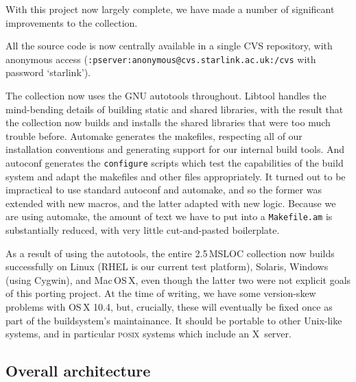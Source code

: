 \documentclass{speauth}
\begin{document}
With this project now largely complete, we have made a number of
significant improvements to the collection.

All the source code is now centrally available in a single CVS
repository, with anonymous access
(\texttt{:pserver:anonymous@cvs.starlink.ac.uk:/cvs} with password `starlink').

The collection now uses the GNU autotools throughout.  Libtool handles the
mind-bending details of building static and shared libraries, with the
result that the collection now builds and installs the shared
libraries that were too much trouble before.  Automake generates the
makefiles, respecting all of our installation conventions and
generating support for our internal build tools.  And autoconf
generates the \texttt{configure} scripts which test the capabilities
of the build system and adapt the makefiles and other files
appropriately.  It turned out to be impractical to use standard
autoconf and automake, and so the former was extended with new macros,
and the latter adapted with new logic.  Because we are using automake,
the amount of text we have to put into a \texttt{Makefile.am} is
substantially reduced, with very little cut-and-pasted boilerplate.

As a result of using the autotools, the entire 2.5\,MSLOC collection
now builds successfully on Linux (RHEL is our current test platform),
Solaris, Windows (using Cygwin), and Mac\,OS\,X, even though the
latter two were not explicit goals of this porting project.  At the
time of writing, we have some version-skew problems with OS\,X 10.4,
but, crucially, these will eventually be fixed once as part of the
buildsystem's maintainance.  It should
be portable to other Unix-like systems, and in particular
\textsc{posix} systems which include an X~server.

\subsection{Overall architecture}
\label{s:arch}
\end{document}
